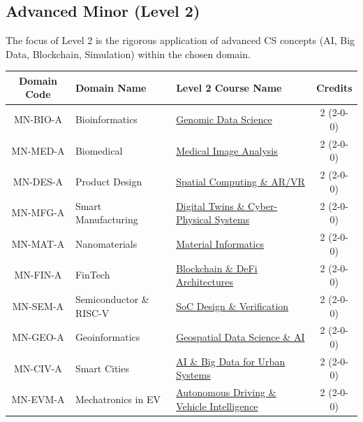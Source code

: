 \label{table:minor_l2}
\subsection*{Advanced Minor (Level 2)}
\noindent The focus of Level 2 is the rigorous application of advanced CS concepts (AI, Big Data, Blockchain, Simulation) within the chosen domain.

\begin{longtable}{|c|p{4cm}|p{7.5cm}|c|}
\hline
\textbf{Domain Code} & \textbf{Domain Name} & \textbf{Level 2 Course Name} & \textbf{Credits} \\
\hline
MN-BIO-A & Bioinformatics & \hyperref[minor:BIO_L2]{Genomic Data Science} & 2 (2-0-0) \\
\hline
MN-MED-A & Biomedical & \hyperref[minor:MED_L2]{Medical Image Analysis} & 2 (2-0-0) \\
\hline
MN-DES-A & Product Design & \hyperref[minor:DES_L2]{Spatial Computing \& AR/VR} & 2 (2-0-0) \\
\hline
MN-MFG-A & Smart Manufacturing & \hyperref[minor:MFG_L2]{Digital Twins \& Cyber-Physical Systems} & 2 (2-0-0) \\
\hline
MN-MAT-A & Nanomaterials & \hyperref[minor:MAT_L2]{Material Informatics} & 2 (2-0-0) \\
\hline
MN-FIN-A & FinTech & \hyperref[minor:FIN_L2]{Blockchain \& DeFi Architectures} & 2 (2-0-0) \\
\hline
MN-SEM-A & Semiconductor \& RISC-V & \hyperref[minor:SEM_L2]{SoC Design \& Verification} & 2 (2-0-0) \\
\hline
MN-GEO-A & Geoinformatics & \hyperref[minor:GEO_L2]{Geospatial Data Science \& AI} & 2 (2-0-0) \\
\hline
MN-CIV-A & Smart Cities & \hyperref[minor:CIV_L2]{AI \& Big Data for Urban Systems} & 2 (2-0-0) \\
\hline
MN-EVM-A & Mechatronics in EV & \hyperref[minor:EVM_L2]{Autonomous Driving \& Vehicle Intelligence} & 2 (2-0-0) \\
\hline
\end{longtable}